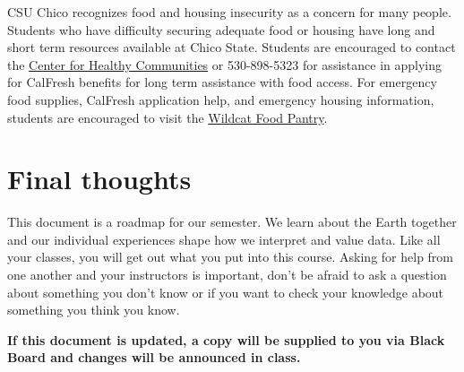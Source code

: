 \documentclass[11pt,]{article}
\begin{document}
CSU Chico recognizes food and housing insecurity as a concern for many
people. Students who have difficulty securing adequate food or housing
have long and short term resources available at Chico State. Students
are encouraged to contact the
\href{https://www.csuchico.edu/chc/}{Center for Healthy Communities} or
530-898-5323 for assistance in applying for CalFresh benefits for long
term assistance with food access. For emergency food supplies, CalFresh
application help, and emergency housing information, students are
encouraged to visit the
\href{https://www.csuchico.edu/basic-needs/pantry.shtml}{Wildcat Food
Pantry}.

\hypertarget{final-thoughts}{%
\section{Final thoughts}\label{final-thoughts}}

This document is a roadmap for our semester. We learn about the Earth
together and our individual experiences shape how we interpret and value
data. Like all your classes, you will get out what you put into this
course. Asking for help from one another and your instructors is
important, don't be afraid to ask a question about something you don't
know or if you want to check your knowledge about something you think
you know.

\textbf{If this document is updated, a copy will be supplied to you via
Black Board and changes will be announced in class.}

\newpage

\renewcommand{\arraystretch}{1.25}
\end{document}
